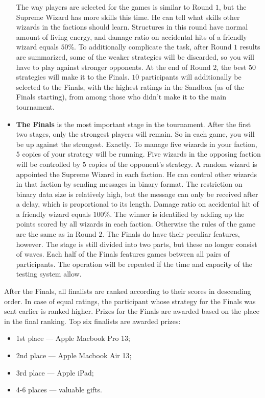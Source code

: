 \begin{itemize}
            The way players are selected for the games is similar to Round $1$, but the Supreme Wizard has more skills this time. He can tell
            what skills other wizards in the factions should learn. Structures in this round have normal amount of living
            energy, and damage ratio on accidental hits of a friendly wizard equals $50\%$. To additionally complicate the task,
            after Round $1$ results are summarized, some of the weaker strategies will be discarded, so you will have to play against stronger
            opponents. At the end of Round $2$, the best $50$ strategies will make it to the Finals. $10$ participants will additionally be selected to the Finals, with
            the highest ratings in the Sandbox (as of the Finals starting), from among those who didn’t make it to the main tournament.
 \item \textbf{The Finals} is the most important stage in the tournament. After the first two stages, only the strongest players will remain. So in
            each game, you will be up against the strongest. Exactly. To manage five wizards in your faction,
            $5$ copies of your strategy will be running. Five wizards in the opposing faction will be controlled by $5$ copies of the
            opponent’s strategy. A random wizard is appointed the Supreme Wizard in each faction. He can control other wizards in that faction
            by sending messages in binary format. The restriction on binary data size is relatively high, but the message can only be received
            after a delay, which is proportional to its length. Damage ratio on accidental hit of a friendly wizard
            equals $100\%$. The winner is identified by adding up the points scored by all wizards in each faction. Otherwise
            the rules of the game are the same as in Round $2$. The Finals do have their peculiar features, however. The stage is still divided into
            two parts, but these no longer consist of waves. Each half of the Finals features games between all pairs of participants.
            The operation will be repeated if the time and capacity of the testing system allow.
\end{itemize}

After the Finals, all finalists are ranked according to their scores in descending order. In case of equal ratings, the participant whose
strategy for the Finals was sent earlier is ranked higher. Prizes for the Finals are awarded based on the place in the final
ranking. Top six finalists are awarded prizes:
\begin{itemize}
\item 1st place --- Apple Macbook Pro 13\textquotedbl;
\item 2nd place --- Apple Macbook Air 13\textquotedbl;
\item 3rd place --- Apple iPad;
\item 4-6 places --- valuable gifts.
\end{itemize}

